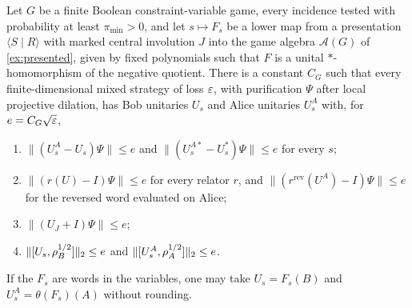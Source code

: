 \begin{proposition}\label{prop:interface}
Let $G$ be a finite Boolean constraint-variable game, every incidence tested with probability at least $\pi_{\min}>0$,
and let $s\mapsto F_s$ be a lower map from a presentation $\langle S\mid R\rangle$ with marked central involution $J$ into
the game algebra $\mathcal A(G)$ of \cref{ex:presented}, given by fixed polynomials such that $F$ is a unital
$*$-homomorphism of the negative quotient. There is a constant $C_G$ such that every finite-dimensional mixed strategy
of loss $\varepsilon$, with purification $\Psi$ after local projective dilation, has Bob unitaries $U_s$ and Alice unitaries
$U_s^A$ with, for $e=C_G\sqrt{\varepsilon}$,
\begin{enumerate}[label=(\alph*),itemsep=1pt]
\item $\|(U_s^A-U_s)\Psi\|\le e$ and $\|(U_s^{A*}-U_s^*)\Psi\|\le e$ for every $s$;
\item $\|(r(U)-I)\Psi\|\le e$ for every relator $r$, and $\|(r^{\mathrm{rev}}(U^A)-I)\Psi\|\le e$ for the reversed word
evaluated on Alice;
\item $\|(U_J+I)\Psi\|\le e$;
\item $\lVert [U_s,\rho_B^{1/2}]\rVert_2\le e$ and $\lVert [U_s^A,\rho_A^{1/2}]\rVert_2\le e$.
\end{enumerate}
If the $F_s$ are words in the variables, one may take $U_s=F_s(B)$ and $U_s^A=\theta(F_s)(A)$ without rounding.
\end{proposition}

